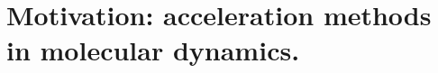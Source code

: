 \documentclass[10pt]{article}
\newcommand{\cL}{\mathcal{L}}
\renewcommand{\d}{\mathrm{d}}
\newcommand{\e}{\mathrm{e}}
\newcommand{\uonetilde}{\widetilde{u}_{1,\beta}^{h_0,h_1}}
\newcommand{\uone}{u_{1,\beta}^{h_0,h_1}}
\newcommand{\utwo}{u_{2,\beta}^{h_0,h_1}}
\newcommand{\utwotilde}{\widetilde{u}_{2,\beta}^{h_0,h_1}}
\newcommand{\lambdaone}{\lambda_{1,\beta}^{h_0,h_1}}
\newcommand{\1}{\mathbbm 1}
\begin{document}


    \tableofcontents

    \section{Motivation: acceleration methods in molecular dynamics.}
\end{document}
